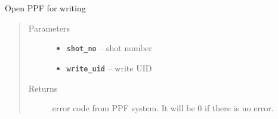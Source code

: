 \documentclass[letterpaper,10pt,english]{sphinxmanual}
\begin{document}
\begin{fulllineitems}
\label{ppf_write:ppf_write.open_ppf}
Open PPF for writing
\begin{quote}\begin{description}
\item[{Parameters}] \leavevmode\begin{itemize}
\item {} 
\textbf{\texttt{shot\_no}} -- shot number

\item {} 
\textbf{\texttt{write\_uid}} -- write UID

\end{itemize}

\item[{Returns}] \leavevmode
error code from PPF system. It will be 0 if there is no error.

\end{description}\end{quote}

\end{fulllineitems}

\end{document}

